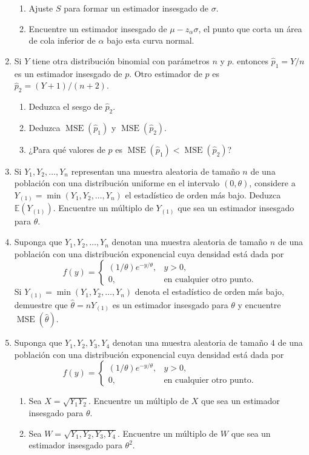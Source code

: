 \documentclass[a4paper]{scrreprt}
\begin{document}
\begin{enumerate}
\begin{enumerate}
	\item Ajuste $S$ para formar un estimador insesgado de $\sigma$.
	\item Encuentre un estimador insesgado de $\mu-z_{\alpha}\sigma$, el punto que corta un área de cola inferior de $\alpha$ bajo esta curva normal.
\end{enumerate}
\item Si $Y$ tiene otra distribución binomial con parámetros $n$ y $p$. entonces $\hat{p}_{1}=Y/n$ es un estimador insesgado de $p$. Otro estimador de $p$ es $\hat{p}_{2}=\left(Y+1\right)/\left(n+2\right)$.
\begin{enumerate}
	\item Deduzca el sesgo de $\hat{p}_{2}$.
	\item Deduzca $\operatorname{MSE}\left(\hat{p}_{1}\right)$ y $\operatorname{MSE}\left(\hat{p}_{2}\right)$.
	\item ¿Para qué valores de $p$ es $\operatorname{MSE}\left(\hat{p}_{1}\right)<\operatorname{MSE}\left(\hat{p}_{2}\right)$?
\end{enumerate}
\item Si $Y_{1},Y_{2},\ldots,Y_{n}$ representan una muestra aleatoria de tamaño $n$ de una población con una distribución uniforme en el intervalo $\left(0,\theta\right)$, considere a $Y_{\left(1\right)}=\min\left(Y_{1},Y_{2},\ldots,Y_{n}\right)$ el estadístico de orden más bajo. Deduzca $\mathds{E}\left(Y_{\left(1\right)}\right)$. Encuentre un múltiplo de $Y_{\left(1\right)}$ que sea un estimador insesgado para $\theta$.
\item Suponga que $Y_{1},Y_{2},\ldots,Y_{n}$ denotan una muestra aleatoria de tamaño $n$ de una población con una distribución exponencial cuya densidad está dada por \[ f\left(y\right)=\begin{cases}\left(1/\theta\right)e^{-y/\theta},&y>0,\\0,&\text{en cualquier otro punto}.\end{cases} \] Si $Y_{\left(1\right)}=\min\left(Y_{1},Y_{2},\ldots,Y_{n}\right)$ denota el estadístico de orden más bajo, demuestre que $\hat{\theta}=nY_{\left(1\right)}$ es un estimador insesgado para $\theta$ y encuentre $\operatorname{MSE}\left(\hat{\theta}\right)$.
\item Suponga que $Y_{1},Y_{2},Y_{3},Y_{4}$ denotan una muestra aleatoria de tamaño $4$ de una población con una distribución exponencial cuya densidad está dada por \[ f\left(y\right)=\begin{cases}\left(1/\theta\right)e^{-y/\theta},&y>0,\\0,&\text{en cualquier otro punto}.\end{cases} \]
\begin{enumerate}
	\item Sea $X=\sqrt{Y_{1}Y_{2}}$. Encuentre un múltiplo de $X$ que sea un estimador insesgado para $\theta$.
	\item Sea $W=\sqrt{Y_{1},Y_{2},Y_{3},Y_{4}}$. Encuentre un múltiplo de $W$ que sea un estimador insesgado para $\theta^{2}$.
\end{enumerate}
\end{enumerate}
\end{document}
